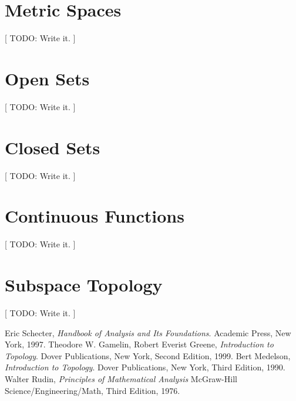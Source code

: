 \documentclass[12pt,a4paper]{article}
\theoremstyle{definition}
\begin{document}
\section{Metric Spaces}

[ TODO: Write it. ]

\section{Open Sets}

[ TODO: Write it. ]

\section{Closed Sets}

[ TODO: Write it. ]

\section{Continuous Functions}

[ TODO: Write it. ]

\section{Subspace Topology}

[ TODO: Write it. ]

\begin{thebibliography}{9}
  Eric Schecter,
  \emph{Handbook of Analysis and Its Foundations}.
  Academic Press, New York,
  1997.
  Theodore W. Gamelin, Robert Everist Greene,
  \emph{Introduction to Topology}.
  Dover Publications, New York,
  Second Edition,
  1999.
  Bert Medelson,
  \emph{Introduction to Topology}.
  Dover Publications, New York,
  Third Edition,
  1990.
  Walter Rudin,
  \emph{Principles of Mathematical Analysis}
  McGraw-Hill Science/Engineering/Math, 
  Third Edition,
  1976.
\end{thebibliography}
\end{document}
